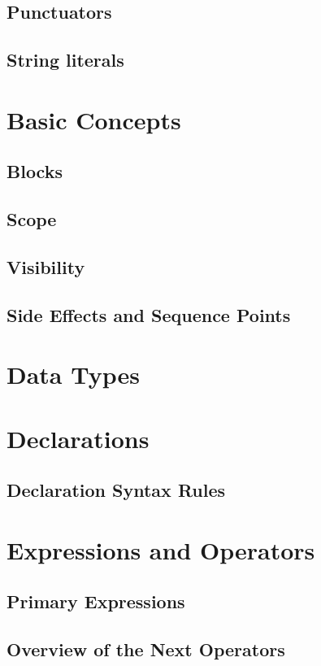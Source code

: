 \documentclass[12pt]{article}
\begin{document}
\subsection{Punctuators}
\subsection{String literals}

\section{Basic Concepts}
\subsection{Blocks}
\subsection{Scope}
\subsection{Visibility}
\subsection{Side Effects and Sequence Points}

\section{Data Types}

\section{Declarations}
\subsection{Declaration Syntax Rules}

\section{Expressions and Operators}
\subsection{Primary Expressions}
\subsection{Overview of the Next Operators}
\end{document}
